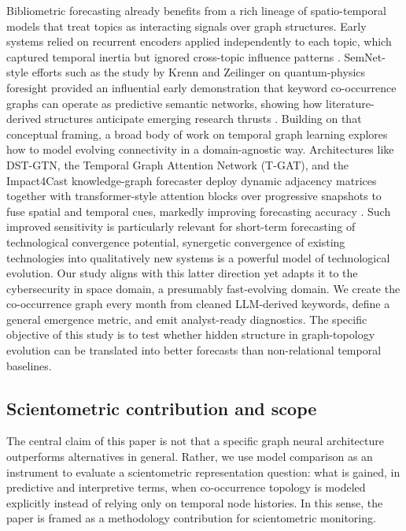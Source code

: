 \documentclass[pdflatex,sn-basic]{sn-jnl}
\begin{document}
Bibliometric forecasting already benefits from a rich lineage of spatio-temporal models that treat topics as interacting signals over graph structures.
Early systems relied on recurrent encoders applied independently to each topic, which captured temporal inertia but ignored cross-topic influence patterns \cite{he2019topicforecast,xu2020trendrnn}.
SemNet-style efforts such as the study by Krenn and Zeilinger on quantum-physics foresight provided an influential early demonstration that keyword co-occurrence graphs can operate as predictive semantic networks,
showing how literature-derived structures anticipate emerging research thrusts \cite{krenn2020predicting}.
Building on that conceptual framing, a broad body of work on temporal graph learning explores how to model evolving connectivity in a domain-agnostic way. Architectures like DST-GTN, the Temporal Graph Attention Network (T-GAT), and the Impact4Cast knowledge-graph forecaster deploy dynamic adjacency matrices together with transformer-style attention blocks over progressive snapshots to fuse spatial and temporal cues, markedly improving forecasting accuracy \cite{li2021dstgtn,zhao2023tgat,gu2024impact4cast}.
Such improved sensitivity is particularly relevant for short-term forecasting of technological convergence potential, synergetic convergence of existing technologies into qualitatively new systems is a powerful model of technological evolution.
Our study aligns with this latter direction yet adapts it to the cybersecurity in space domain, a presumably fast-evolving domain. We create the co-occurrence graph every month from cleaned LLM-derived keywords, define a general emergence metric, and emit analyst-ready diagnostics.
The specific objective of this study is to test whether hidden structure in graph-topology evolution can be translated into better forecasts than non-relational temporal baselines.

\subsection{Scientometric contribution and scope}
The central claim of this paper is not that a specific graph neural architecture outperforms alternatives in general. Rather, we use model comparison as an instrument to evaluate a scientometric representation question: what is gained, in predictive and interpretive terms, when co-occurrence topology is modeled explicitly instead of relying only on temporal node histories. In this sense, the paper is framed as a methodology contribution for scientometric monitoring.
\end{document}

